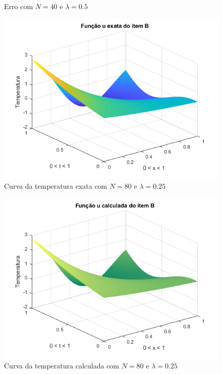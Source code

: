 \documentclass[12pt]{article}
\begin{document}
\begin{spacing}{1.5}
\begin{figure}
    \caption{Erro com $N=40$ e $\lambda=0.5$}
    \label{fig:B_n40lambda0-5_erro}
\end{figure}


\begin{figure}
    \centering
    \includegraphics[width=0.8\linewidth]{Primeira_Tarefa/ItemB/n80_lambda0-25_exata.png}
    \caption{Curva da temperatura exata com $N=80$ e $\lambda=0.25$}
    \label{fig:B_n80lambda0-25_exata}
\end{figure}
\begin{figure}
    \centering
    \includegraphics[width=0.8\linewidth]{Primeira_Tarefa/ItemB/n80_lambda0-25_calc.png}
    \caption{Curva da temperatura calculada com $N=80$ e $\lambda=0.25$}
    \label{fig:B_n80lambda0-25_calc}
\end{figure}
\begin{figure}
    \centering

\end{figure}
\end{spacing}
\end{document}
